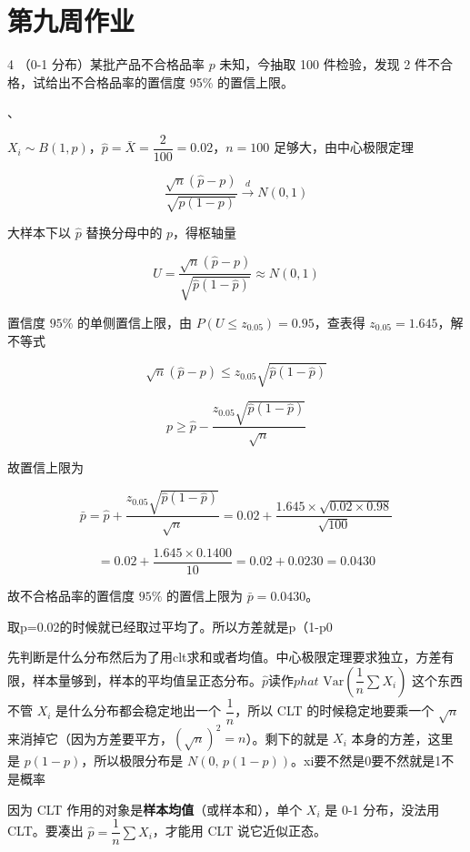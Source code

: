 \section{第九周作业}
\begin{homework}{4}
（0-1 分布）某批产品不合格品率 $p$ 未知，今抽取 100 件检验，发现 2 件不合格，试给出不合格品率的置信度 95\% 的置信上限。
\end{homework}、
\begin{solution}
$X_i \sim B(1,p)$，$\hat{p} = \bar{X} = \dfrac{2}{100} = 0.02$，$n = 100$ 足够大，由中心极限定理

$$\frac{\sqrt{n}(\hat{p}-p)}{\sqrt{p(1-p)}} \xrightarrow{d} N(0,1)$$

大样本下以 $\hat{p}$ 替换分母中的 $p$，得枢轴量

$$U = \frac{\sqrt{n}(\hat{p}-p)}{\sqrt{\hat{p}(1-\hat{p})}} \approx N(0,1)$$

置信度 $95\%$ 的单侧置信上限，由 $P(U \leq z_{0.05}) = 0.95$，查表得 $z_{0.05} = 1.645$，解不等式

$$\sqrt{n}(\hat{p}-p) \leq z_{0.05}\sqrt{\hat{p}(1-\hat{p})}$$

$$p \geq \hat{p} - \frac{z_{0.05}\sqrt{\hat{p}(1-\hat{p})}}{\sqrt{n}}$$

故置信上限为

$$\bar{p} = \hat{p} + \frac{z_{0.05}\sqrt{\hat{p}(1-\hat{p})}}{\sqrt{n}} = 0.02 + \frac{1.645 \times \sqrt{0.02 \times 0.98}}{\sqrt{100}}$$

$$= 0.02 + \frac{1.645 \times 0.1400}{10} = 0.02 + 0.0230 = 0.0430$$

故不合格品率的置信度 $95\%$ 的置信上限为 $\bar{p} = 0.0430$。
\end{solution}
\begin{dxtips}
    取p=0.02的时候就已经取过平均了。所以方差就是p（1-p0
\end{dxtips}
\begin{dxtips}
    先判断是什么分布然后为了用clt求和或者均值。中心极限定理要求独立，方差有限，样本量够到，样本的平均值呈正态分布。$\hat{p}$读作$phat$
    $
    \text{Var}\!\left(\dfrac{1}{n}\sum X_i\right)$ 这个东西不管 $X_i$ 是什么分布都会稳定地出一个 $\dfrac{1}{n}$，所以 CLT 的时候稳定地要乘一个 $\sqrt{n}$ 来消掉它（因为方差要平方，$(\sqrt{n})^2 = n$）。剩下的就是 $X_i$ 本身的方差，这里是 $p(1-p)$，所以极限分布是 $N(0,\,p(1-p))$。xi要不然是0要不然就是1不是概率
\end{dxtips}
\begin{note}
因为 CLT 作用的对象是\textbf{样本均值}（或样本和），单个 $X_i$ 是 0-1 分布，没法用 CLT。要凑出 $\hat{p} = \dfrac{1}{n}\sum X_i$，才能用 CLT 说它近似正态。
\end{note}
